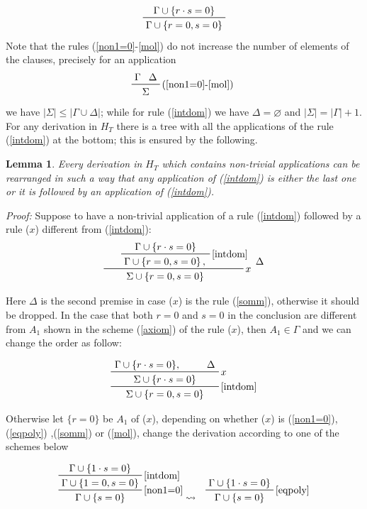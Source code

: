 \documentclass[a4paper,12pt,twoside]{book}
\newtheorem{lemma}[theorem]{Lemma}
\let\emptyset\varnothing
\begin{document}
\begin{equation} \label{intdom}
\prftree{\Gamma \cup \{r\cdot s=0\}}{\Gamma \cup  \{r=0,s=0\} } 
\end{equation}
Note that the rules (\ref{non1=0}-\ref{mol}) do not increase the number of elements of the clauses, precisely for an application 
$$
\prftree[r]{(\ref{non1=0}-\ref{mol}) } {\Gamma}{\Delta}{\hspace{2mm}\Sigma\hspace{2mm}}
$$
we have $ |\Sigma| \leq   |\Gamma\cup\Delta|$; while for rule (\ref{intdom})
we have $\Delta = \emptyset$ and  $ |\Sigma| =   |\Gamma| +1 $. \\

For any derivation in $H_T$ there is a tree with all the applications of the rule (\ref{intdom}) at the bottom; this is ensured by the following.
\begin{lemma}\textit{Every derivation in $H_T$ which contains non-trivial applications can be rearranged in such a way that any application of (\ref{intdom}) is either the last one or it is followed by an application of (\ref{intdom})}.
\end{lemma}
\emph{\noindent \textit{Proof: }}Suppose to have a non-trivial application of a rule (\ref{intdom}) followed by a rule ($x$) different from (\ref{intdom}):
$$
\prftree[r]{$x$}
{\prftree[r]{\ref{intdom}}
{\Gamma\cup\{r\cdot s=0 \}}
{\Gamma\cup\{r=0, s=0 \}\,,}
}
{\Delta}
{\hspace{7mm}\Sigma\cup\{r=0,s=0 \}\hspace{13mm}}
$$

\noindent Here $\Delta$ is the second premise in case ($x$) is the rule (\ref{somm}), otherwise it should be dropped. In the case that both $r=0$ and $s=0$ in the conclusion are different from $A_1$  shown in the scheme (\ref{axiom}) of the rule ($x$), then $A_1\in\Gamma$  and we can change the order as follow:

$$
\prftree[r]{\ref{intdom}}
{\prftree[r]{$x$}
{\Gamma\cup\{r\cdot s=0 \}, \hspace{7mm}}    {\Delta}
{\hspace{7mm}\Sigma\cup\{r\cdot s=0 \}\hspace{7mm}}}
{ {\Sigma\cup\{r=0, s=0 \}}} 
$$

Otherwise let $\{r=0\}$ be $A_1$ of ($x$), depending on whether ($x$) is (\ref{non1=0}),(\ref{eqpoly}) ,(\ref{somm}) or (\ref{mol}), change the derivation according to one of the schemes below


\begin{eqnarray*}
\prftree[r]{\ref{non1=0}} { \prftree[r]{\ref{intdom}} {\Gamma \cup  \{1\cdot s=0\}} {\Gamma \cup  \{1=0, s=0\}} } {\Gamma \cup \{s=0\}}
&  \leadsto 
 &\prftree[r]{\ref{eqpoly}} { \Gamma \cup \{1\cdot s=0\}   } {\Gamma \cup \{s=0\}}
\end{eqnarray*}
\end{document}
